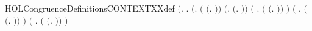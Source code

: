 \begin{SaveVerbatim}{HOLCongruenceDefinitionsCONTEXTXXdef}
\HOLTokenTurnstile{}  \HOLSymConst{\ensuremath{=}}
   \ensuremath{(}\HOLTokenLambda{}.
        \HOLSymConst{\HOLTokenForall{}}.
            \ensuremath{(}\HOLSymConst{\HOLTokenForall{}}.
                 \ensuremath{(} \HOLSymConst{\ensuremath{=}} \ensuremath{(}\HOLTokenLambda{}. \ensuremath{)}\ensuremath{)} \HOLSymConst{\HOLTokenDisj{}} \ensuremath{(}\HOLSymConst{\HOLTokenExists{}}.  \HOLSymConst{\ensuremath{=}} \ensuremath{(}\HOLTokenLambda{}. \ensuremath{)}\ensuremath{)} \HOLSymConst{\HOLTokenDisj{}}
                 \ensuremath{(}\HOLSymConst{\HOLTokenExists{}} . \ensuremath{(} \HOLSymConst{\ensuremath{=}} \ensuremath{(}\HOLTokenLambda{}. \HOLSymConst{\ensuremath{\ldotp}} \ensuremath{)}\ensuremath{)} \HOLSymConst{\HOLTokenConj{}}  \ensuremath{)} \HOLSymConst{\HOLTokenDisj{}}
                 \ensuremath{(}\HOLSymConst{\HOLTokenExists{}} .
                      \ensuremath{(} \HOLSymConst{\ensuremath{=}} \ensuremath{(}\HOLTokenLambda{}.   \HOLSymConst{\ensuremath{+}}  \ensuremath{)}\ensuremath{)} \HOLSymConst{\HOLTokenConj{}}   \HOLSymConst{\HOLTokenConj{}}
                       \ensuremath{)} \HOLSymConst{\HOLTokenDisj{}}
                 \ensuremath{(}\HOLSymConst{\HOLTokenExists{}} .
                      \ensuremath{(} \HOLSymConst{\ensuremath{=}} \ensuremath{(}\HOLTokenLambda{}.   \HOLSymConst{\ensuremath{\mid}}  \ensuremath{)}\ensuremath{)} \HOLSymConst{\HOLTokenConj{}}   \HOLSymConst{\HOLTokenConj{}}
                       \ensuremath{)} \HOLSymConst{\HOLTokenDisj{}}

\end{SaveVerbatim}
